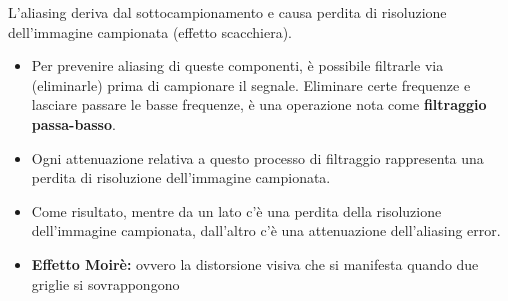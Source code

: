 
L’aliasing deriva dal sottocampionamento e causa perdita di risoluzione
dell’immagine campionata (effetto scacchiera).


\begin{itemize}
    \item Per prevenire aliasing di queste componenti, è possibile filtrarle via
          (eliminarle) prima di campionare il segnale. Eliminare certe frequenze
          e lasciare passare le basse frequenze, è una operazione nota come
          \textbf{filtraggio passa-basso}.
    \item Ogni attenuazione relativa a questo processo di filtraggio rappresenta
          una perdita di risoluzione dell’immagine campionata.
    \item Come risultato, mentre da un lato c’è una perdita della risoluzione
          dell’immagine campionata, dall’altro c’è una attenuazione
          dell’aliasing error.
    \item \textbf{Effetto Moirè:} ovvero la distorsione visiva che si manifesta
          quando due griglie si sovrappongono
\end{itemize}
